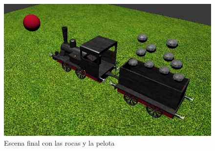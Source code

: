 \documentclass{article}
\begin{document}
\begin{figure}
    \centering
    \includegraphics[width=\textwidth]{images/final.png}
    \caption{Escena final con las rocas y la pelota}
    \label{fig:final}
\end{figure}
\end{document}
